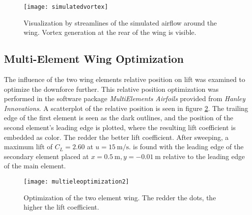   \begin{figure}
    \texttt{[image: simulatedvortex]}
    \caption{Visualization by streamlines of the simulated airflow around the wing. Vortex generation at the rear of the wing is visible.}
    \label{fig:simvortex}
  \end{figure}

  \subsection{Multi-Element Wing Optimization}
  The influence of the two wing elements relative position on lift was examined to optimize the downforce further. This relative position optimization was performed in the software package \emph{MultiElements Airfoils} provided from \emph{Hanley Innovations}. A scatterplot of the relative position is seen in figure \ref{fig:multieleoptimization}. The trailing edge of the first element is seen as the dark outlines, and the position of the second element's leading edge is plotted, where the resulting lift coefficient is embedded as color. The redder the better lift coefficient. After sweeping, a maximum lift of $C_L = 2.60$  at $u = \SI{15}{\metre\per\second}$. is found with the leading edge of the secondary element placed at $x=\SI{0.5}{\metre},y=\SI{-0.01}{\metre}$ relative to the leading edge of the main element.

  \begin{figure}
    \texttt{[image: multieleoptimization2]}
    \caption{Optimization of the two element wing. The redder the dots, the higher the lift coefficient.}
    \label{fig:multieleoptimization}
  \end{figure}
